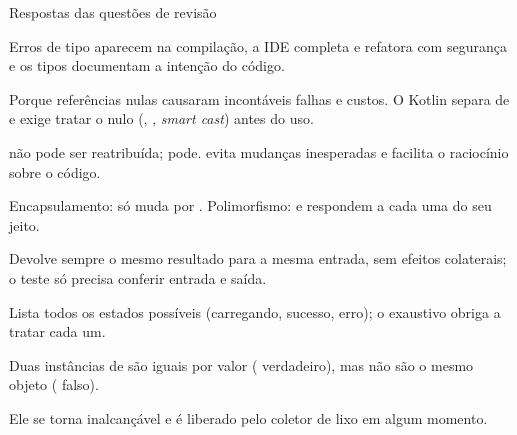 \documentclass[aspectratio=169,10pt]{beamer}
\begin{document}
\begin{frame}{Respostas das questões de revisão}
  \begin{respostas}
    \item Erros de tipo aparecem na compilação, a IDE completa e refatora com segurança e os tipos documentam a intenção do código.
    \item Porque referências nulas causaram incontáveis falhas e custos. O Kotlin separa  de  e exige tratar o nulo (, , \emph{smart cast}) antes do uso.
    \item {} não pode ser reatribuída;  pode.  evita mudanças inesperadas e facilita o raciocínio sobre o código.
    \item Encapsulamento:  só muda por . Polimorfismo:  e  respondem a  cada uma do seu jeito.
    \item Devolve sempre o mesmo resultado para a mesma entrada, sem efeitos colaterais; o teste só precisa conferir entrada e saída.
    \item Lista todos os estados possíveis (carregando, sucesso, erro); o  exaustivo obriga a tratar cada um.
    \item Duas instâncias de  são iguais por valor (\cod{==} verdadeiro), mas não são o mesmo objeto (\cod{===} falso).
    \item Ele se torna inalcançável e é liberado pelo coletor de lixo em algum momento.
  \end{respostas}
\end{frame}

\end{document}
